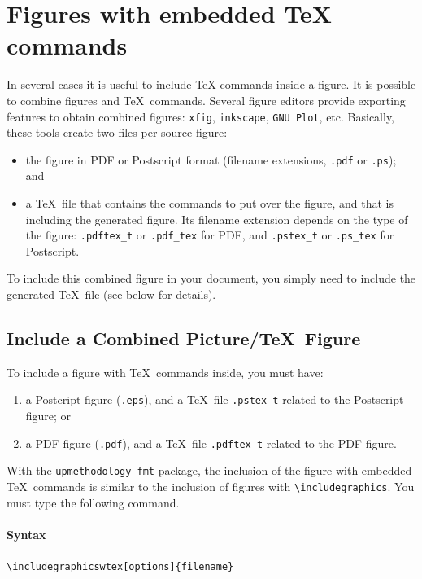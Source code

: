 \documentclass[book,taskpackage,specpackage,codepackage]{upmethodology-document}
\begin{document}
\section{Figures with embedded \TeX\xspace commands}

In several cases it is useful to include \TeX\xspace commands inside a figure. It is possible to combine figures and \TeX\ commands. Several figure editors provide exporting features to obtain combined figures: \texttt{xfig}, \texttt{inkscape}, \texttt{GNU Plot}, etc. Basically, these tools create two files per source figure: \begin{itemize}
\item the figure in PDF or Postscript format (filename extensions, \texttt{.pdf} or \texttt{.ps}); and
\item a \TeX\ file that contains the commands to put over the figure, and that is including the generated figure. Its filename extension depends on the type of the figure: \texttt{.pdftex\_t} or \texttt{.pdf\_tex} for PDF, and \texttt{.pstex\_t} or \texttt{.ps\_tex} for Postscript.
\end{itemize}
To include this combined figure in your document, you simply need to include the generated \TeX\ file (see below for details).

\subsection{Include a Combined Picture/\TeX\ Figure}

To include a figure with \TeX\ commands inside, you must have: \begin{enumerate}
\item a Postcript figure (\texttt{.eps}), and a \TeX\ file \texttt{.pstex\_t} related to the Postscript figure; or
\item a PDF figure (\texttt{.pdf}), and a \TeX\ file \texttt{.pdftex\_t} related to the PDF figure.
\end{enumerate}

With the \texttt{upmethodology-fmt} package, the inclusion of the figure with embedded \TeX\ commands is similar to the inclusion of figures with \texttt{{\textbackslash}includegraphics}. You must type the following command.

\paragraph{Syntax} \texttt{{\textbackslash}includegraphicswtex[options]\{filename\}}
\end{document}
